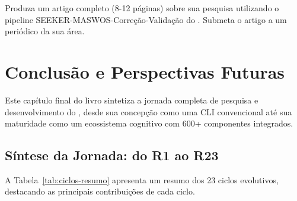 \begin{exercicio}
    Produza um artigo completo (8-12 páginas) sobre sua pesquisa utilizando
    o pipeline SEEKER-MASWOS-Correção-Validação do \opencodeeco{}. Submeta
    o artigo a um periódico \qualisA{} da sua área.
\end{exercicio}

\section{Conclusão e Perspectivas Futuras}
\label{sec:conclusao-perspectivas}
\nivelphd

Este capítulo final do livro sintetiza a jornada completa de pesquisa e
desenvolvimento do \opencodeeco{}, desde sua concepção como uma CLI
convencional até sua maturidade como um ecossistema cognitivo com 600+
componentes integrados.

\subsection{Síntese da Jornada: do R1 ao R23}

A Tabela~\ref{tab:ciclos-resumo} apresenta um resumo dos 23 ciclos evolutivos,
destacando as principais contribuições de cada ciclo.

